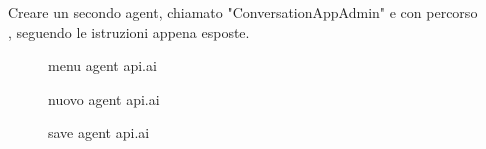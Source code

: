 Creare un secondo agent, chiamato "ConversationAppAdmin" e con percorso\\ , seguendo le istruzioni appena esposte.
\begin{figure}[H]
	\caption{menu agent api.ai}\label{fig:menuapi}
\end{figure}
\begin{figure}[H]
	\caption{nuovo agent api.ai}\label{fig:newAgent}
\end{figure}
\begin{figure}[H]
	\caption{save agent api.ai}\label{fig:saveAgent}
\end{figure}
